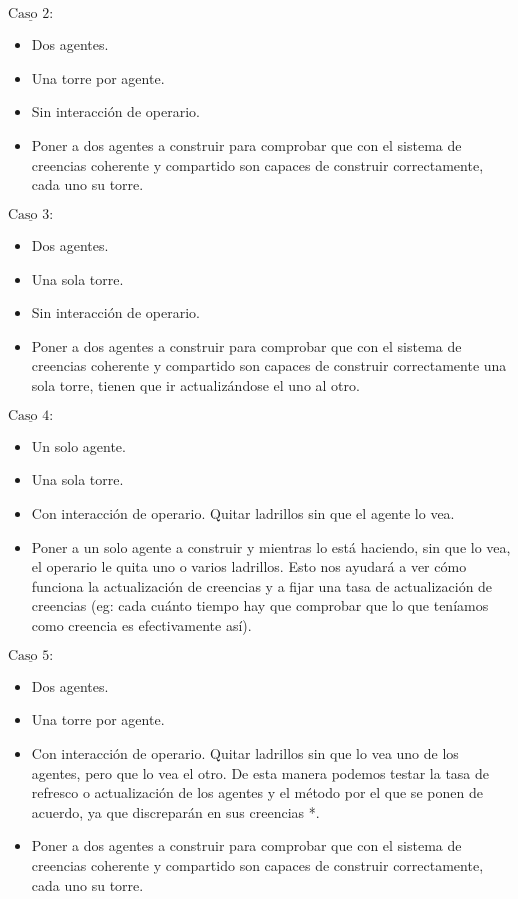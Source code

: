 \documentclass[12pt]{report}
\newcommand{\textunderline}[1]{$\underline{\mbox{#1}}$} %
\begin{document}
  \textunderline{Caso 2:}
    \begin{itemize}
      \item Dos agentes.
      \item Una torre por agente.
      \item Sin interacci\'on de operario.
      \item Poner a dos agentes a construir para comprobar que con el sistema de creencias coherente y compartido son capaces de construir correctamente, cada uno su torre.
    \end{itemize}

  \textunderline{Caso 3:}
    \begin{itemize}
      \item Dos agentes.
      \item Una sola torre.
      \item Sin interacci\'on de operario.
      \item Poner a dos agentes a construir para comprobar que con el sistema de creencias coherente y compartido son capaces de construir correctamente una sola torre, tienen que ir actualiz\'andose el uno al otro.
    \end{itemize}

  \textunderline{Caso 4:}
    \begin{itemize}
      \item Un solo agente.
      \item Una sola torre.
      \item Con interacci\'on de operario. Quitar ladrillos sin que el agente lo vea.
      \item Poner a un solo agente a construir y mientras lo est\'a haciendo, sin que lo vea, el operario le quita uno o varios ladrillos. Esto nos ayudar\'a a ver c\'omo funciona la actualizaci\'on de creencias y a fijar una tasa de actualizaci\'on de creencias (eg: cada cu\'anto tiempo hay que comprobar que lo que ten\'iamos como creencia es efectivamente as\'i).
    \end{itemize}

  \textunderline{Caso 5:}
    \begin{itemize}
      \item Dos agentes.
      \item Una torre por agente.
      \item Con interacci\'on de operario. Quitar ladrillos sin que lo vea uno de los agentes, pero que lo vea el otro. De esta manera podemos testar la tasa de refresco o actualizaci\'on de los agentes y el m\'etodo por el que se ponen de acuerdo, ya que discrepar\'an en sus creencias *.
      \item Poner a dos agentes a construir para comprobar que con el sistema de creencias coherente y compartido son capaces de construir correctamente, cada uno su torre.
    \end{itemize}
\end{document}
